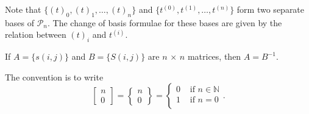 Note that $\{ (t)_0, (t)_1, \dotsc, (t)_n \}$ and 
$\{ t^{(0)}, t^{(1)}, \dotsc, t^{(n)} \}$ form two separate bases of 
$\mathcal{P}_n.$ The change of basis formulae for these bases are given
by the relation between $(t)_i$ and  $t^{(i)}.$

If $A = \{ s(i,j) \}$ and $ B = \{S(i,j) \} $ are $n \, \times  \, n$
matrices, then $A = B^{-1}.$

The convention is to write 
$$\begin{bmatrix}n\\0\end{bmatrix} =
\begin{Bmatrix}n\\0\end{Bmatrix} = 
\begin{cases}
0 & \text{ if } n \in \mathbb{N} \\
1 & \text{ if } n = 0 \\
\end{cases}. $$

